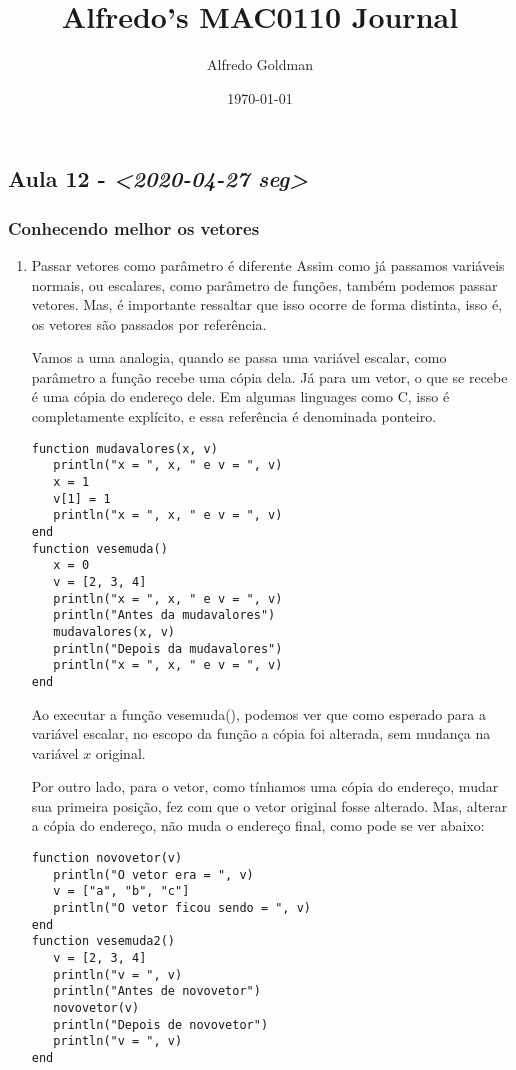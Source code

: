 \documentclass[a4paper]{article}
\author{Alfredo Goldman}
\date{\today}
\title{Alfredo's MAC0110 Journal}
\begin{document}
\maketitle

\subsection{Aula 12 - \textit{<2020-04-27 seg>}}
\label{sec:orga4507d2}
\subsubsection{Conhecendo melhor os vetores}
\label{sec:org0637f4e}
\begin{enumerate}
\item Passar vetores como parâmetro é diferente
\label{sec:orgee55b0d}
Assim como já passamos variáveis normais, ou escalares, como
parâmetro de funções, também podemos passar vetores. Mas, é importante
ressaltar que isso ocorre de forma distinta, isso é, os vetores são
passados por referência.

Vamos a uma analogia, quando se passa uma variável escalar, como
parâmetro a função recebe uma cópia dela. Já para um vetor, o que se
recebe é uma cópia do endereço dele. Em algumas linguages como C, isso
é completamente explícito, e essa referência é denominada ponteiro.

\lstset{language=ein-julia,label= ,caption= ,captionpos=b,numbers=none}
\begin{lstlisting}
function mudavalores(x, v)
   println("x = ", x, " e v = ", v)
   x = 1
   v[1] = 1
   println("x = ", x, " e v = ", v)
end
function vesemuda()
   x = 0
   v = [2, 3, 4]
   println("x = ", x, " e v = ", v)
   println("Antes da mudavalores")
   mudavalores(x, v)
   println("Depois da mudavalores")
   println("x = ", x, " e v = ", v)
end
\end{lstlisting}

Ao executar a função vesemuda(), podemos ver que como esperado para
a variável escalar, no escopo da função a cópia foi alterada, sem
mudança na variável \(x\) original.

 Por outro lado, para o vetor, como tínhamos uma cópia do endereço,
mudar sua primeira posição, fez com que o vetor original fosse alterado.
Mas, alterar a cópia do endereço, não muda o endereço final, como pode
se ver abaixo:

\lstset{language=ein-julia,label= ,caption= ,captionpos=b,numbers=none}
\begin{lstlisting}
function novovetor(v)
   println("O vetor era = ", v)
   v = ["a", "b", "c"]
   println("O vetor ficou sendo = ", v)
end
function vesemuda2()
   v = [2, 3, 4]
   println("v = ", v)
   println("Antes de novovetor")
   novovetor(v)
   println("Depois de novovetor")
   println("v = ", v)
end
\end{lstlisting}


\end{enumerate}
\end{document}

